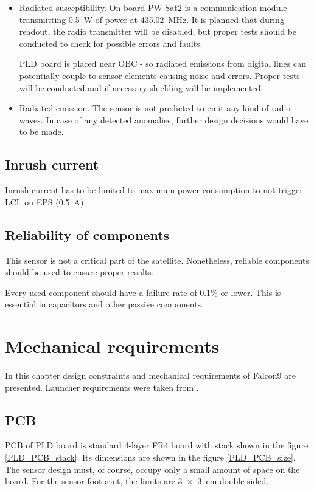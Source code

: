 \begin{itemize}
            \item Radiated susceptibility.
                On board PW-Sat2 is a communication module transmitting \SI{0.5}{\watt} of power at \SI{435.02}{\mega\hertz}. It is planned that during readout, the radio transmitter will be disabled, but proper tests should be conducted to check for possible errors and faults.

                PLD board is placed near OBC - so radiated emissions from digital lines can potentially couple to sensor elements causing noise and errors. Proper tests will be conducted and if necessary shielding will be implemented.

            \item Radiated emission.
                The sensor is not predicted to emit any kind of radio waves. In case of any detected anomalies, further design decisions would have to be made.

        \end{itemize}


    \subsection{Inrush current}
        Inrush current has to be limited to maximum power consumption to not trigger LCL on EPS (\SI{0.5}{\ampere}).

    \subsection{Reliability of components}
        This sensor is not a critical part of the satellite. Nonetheless, reliable components should be used to ensure proper results.

        Every used component should have a failure rate of $0.1\si{\percent}$ or lower. This is essential in capacitors and other passive components.

\section{Mechanical requirements}
    In this chapter design constraints and mechanical requirements of Falcon9 are presented. Launcher requirements were taken from \cite{Falcon9_user_manual}.

    \subsection{PCB}
    \label{PCB_description}
        PCB of PLD board is standard 4-layer FR4 board with stack shown in the figure \ref{PLD_PCB_stack}. Its dimensions are shown in the figure \ref{PLD_PCB_size}. The sensor design must, of course, occupy only a small amount of space on the board. For the sensor footprint, the limits are \SI{3x3}{\centi\meter} double sided.

